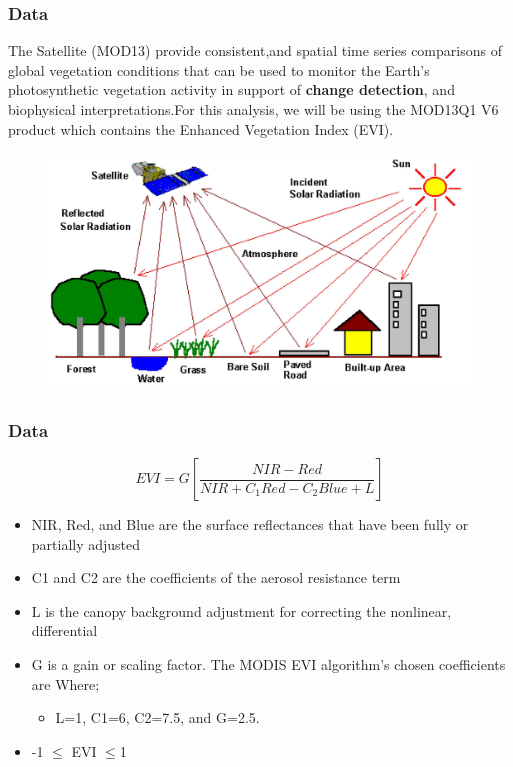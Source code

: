\documentclass[11pt]{beamer}
\begin{document}
\begin{frame}
	\frametitle{Data}
		
The Satellite (MOD13) provide consistent,and spatial time series comparisons of global vegetation conditions that can be used to monitor the Earth’s  photosynthetic vegetation activity in support of  \textbf{change detection}, and biophysical interpretations.For this analysis, we will be using the MOD13Q1 V6 product which contains the Enhanced Vegetation Index (EVI).
	\begin{figure}
		\centering
		\includegraphics[width=0.7\linewidth]{images/classification}
		\caption{}
		\label{fig:classification}
	\end{figure}
	
\end{frame}

\begin{frame}
	\frametitle{Data}
\begin{equation}
	EVI = G\left[ \frac{NIR - Red}{NIR + C_{1}Red - C_{2}Blue + L}\right]
\end{equation}
	
\begin{itemize}
\item 	NIR, Red, and Blue are the surface reflectances that have been fully or partially adjusted
\item	C1 and C2 are the coefficients of the aerosol resistance term
\item	L is the canopy background adjustment for correcting the nonlinear, differential
\item   G is a gain or scaling factor. The MODIS EVI algorithm's chosen coefficients are
Where;  
		\begin{itemize}
			\item   L=1, C1=6, C2=7.5, and G=2.5.
		\end{itemize}
	
	\item  -1 $\leq$ EVI $\leq$1
\end{itemize}
	
\end{frame}
\end{document}
